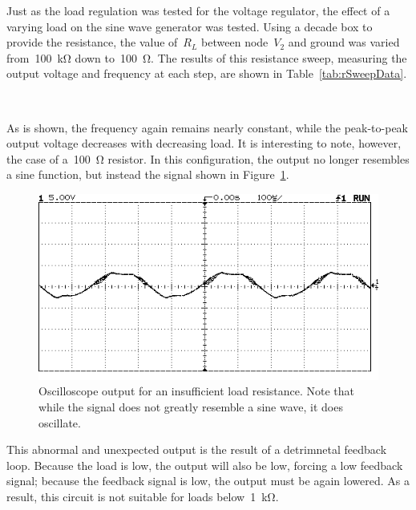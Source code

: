 Just as the load regulation was tested for the voltage regulator, the effect of
a varying load on the sine wave generator was tested.  Using a decade box to
provide the resistance, the value of~$R_L$ between node~$V_2$ and ground was
varied from~\SI{100}{\kilo\ohm} down to~\SI{100}{\ohm}.  The results of this
resistance sweep, measuring the output voltage and frequency at each step, are
shown in Table~\ref{tab:rSweepData}.
%
\begin{table}[H]
	\centering
	\\
	\parbox[Resistance Sweep Data]{.6\textwidth}{
	\caption{Measured values from the load regulation tests.  Note that at a
	load of~\SI{100}{\ohm}, a sine wave is not actually produced, but the
	output does oscillate.}
	\label{tab:rSweepData}
	}
\end{table}
%
As is shown, the frequency again remains nearly constant, while the
peak-to-peak output voltage decreases with decreasing load.  It is interesting
to note, however, the case of a~\SI{100}{\ohm} resistor.  In this
configuration, the output no longer resembles a sine function, but instead the
signal shown in Figure~\ref{fig:lowLoad}.
%
\begin{figure}[H]
	\centering
	\includegraphics[width=.6\textwidth]{img/shot/pt5_100Shot.png}
	\parbox{.6\textwidth}{
	\caption[Oscilloscope Screenshot --- Insufficient Load]{Oscilloscope output
	for an insufficient load resistance.  Note that while the signal does not
	greatly resemble a sine wave, it does oscillate.}
	\label{fig:lowLoad}
	}
\end{figure}
%
This abnormal and unexpected output is the result of a detrimnetal feedback
loop.  Because the load is low, the output will also be low, forcing a low
feedback signal; because the feedback signal is low, the output must be again
lowered.  As a result, this circuit is not suitable for loads
below~\SI{1}{\kilo\ohm}.
